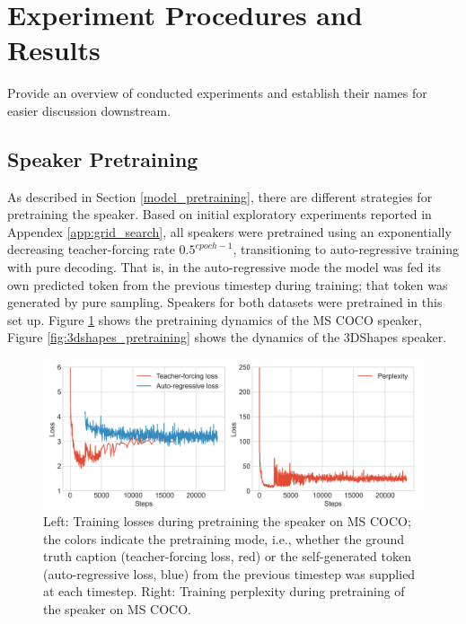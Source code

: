 \section{Experiment Procedures and Results}


Provide an overview of conducted experiments and establish their names for easier discussion downstream.

\subsection{Speaker Pretraining}
As described in Section \ref{model_pretraining}, there are different strategies for pretraining the speaker. Based on initial exploratory experiments reported in Appendex \ref{app:grid_search}, all speakers were pretrained using an exponentially decreasing teacher-forcing rate $0.5^{epoch-1}$, transitioning to auto-regressive training with pure decoding. That is, in the auto-regressive mode the model was fed its own predicted token from the previous timestep during training; that token was generated by pure sampling. Speakers for both datasets were pretrained in this set up. Figure \ref{fig:coco_pretraining} shows the pretraining dynamics of the MS COCO speaker, Figure \ref{fig:3dshapes_pretraining} shows the dynamics of the 3DShapes speaker.


\begin{figure}
	\centering
	\includegraphics[width=\linewidth]{images/coco_pretraining_losses_ppls.png}
	\caption{Left: Training losses during pretraining the speaker on MS COCO; the colors indicate the pretraining mode, i.e., whether the ground truth caption (teacher-forcing loss, red) or the self-generated token (auto-regressive loss, blue) from the previous timestep was supplied at each timestep. Right: Training perplexity during pretraining of the speaker on MS COCO.}
	\label{fig:coco_pretraining}
\end{figure}  

